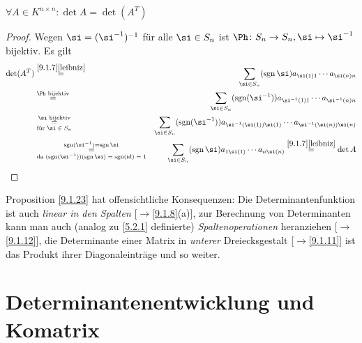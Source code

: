 \documentclass[../../main.tex]{subfiles}
\begin{document}
\begin{pro}\label{9.1.23}
$\forall A\in K^{n\times n}:\det A=\det(A^T)$
\end{pro}

\begin{proof}
Wegen $\si=(\si^{-1})^{-1}$ für alle $\si\in S_n$ ist $\Ph\colon S_n\to S_n,\si\mapsto\si^{-1}$ bijektiv. Es gilt
\begin{eqnarray*}
\det(A^T)&\overset{\ref{9.1.7}\eqref{leibniz}}=&\sum_{\si\in S_n}(\sgn\si)a_{\si(1)1}\dotsm a_{\si(n)n}\\
&\overset{\text{$\Ph$ bijektiv}}=&\sum_{\si\in S_n}(\sgn(\si^{-1}))a_{\si^{-1}(1)1}\dotsm a_{\si^{-1}(n)n}\\
&\underset{\text{für $\si\in S_n$}}{\overset{\text{$\si$ bijektiv}}=}&\sum_{\si\in S_n}(\sgn(\si^{-1}))a_{\si^{-1}(\si(1))\si(1)}\dotsm a_{\si^{-1}(\si(n))\si(n)}\\
&\underset{\text{da $(\sgn(\si^{-1}))(\sgn\si)=\sgn(\id)=1$}}{\overset{\sgn(\si^{-1})=\sgn\si}=}&
\sum_{\si\in S_n}(\sgn\si)a_{1\si(1)}\dotsm a_{n\si(n)}\overset{\ref{9.1.7}\eqref{leibniz}}=\det A
\end{eqnarray*}
\end{proof}

\begin{bem}\label{9.1.24}
Proposition \ref{9.1.23} hat offensichtliche Konsequenzen: Die Determinantenfunktion ist auch \emph{linear in den Spalten} [$\to$\ref{9.1.8}(a)], zur Berechnung
von Determinanten kann man auch (analog zu \ref{5.2.1} definierte) \emph{Spaltenoperationen} heranziehen [$\to$\ref{9.1.12}], die Determinante einer
Matrix in \emph{unterer} Dreiecksgestalt [$\to$\ref{9.1.11}] ist das Produkt ihrer Diagonaleinträge und so weiter.
\end{bem}

\section{Determinantenentwicklung und Komatrix}
\end{document}
